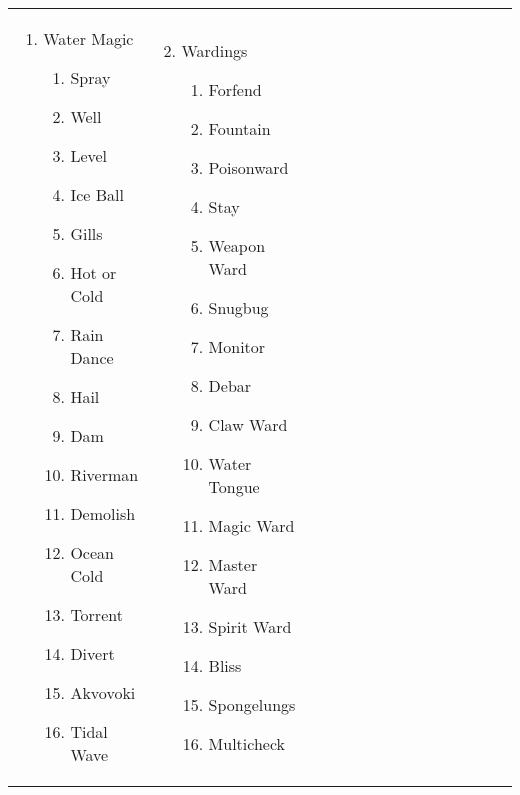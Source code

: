 \renewcommand{\labelenumii}{\arabic{enumii}.}
\begin{tabular}{@{} p{0.25\linewidth} p{0.25\linewidth} p{0.25\linewidth} p{0.25\linewidth}}
\begin{enumerate}
	\item Water Magic
	\begin{enumerate}
		\item Spray
		\item Well
		\item Level
		\item Ice Ball
		\item Gills
		\item Hot or Cold
		\item Rain Dance
		\item Hail
		\item Dam
		\item Riverman
		\item Demolish
		\item Ocean Cold
		\item Torrent
		\item Divert
		\item Akvovoki
		\item Tidal Wave
	\end{enumerate}
\end{enumerate} &
\begin{enumerate}
	\setcounter{enumi}{1}
	\item Wardings
	\begin{enumerate}
		\item Forfend
		\item Fountain
		\item Poisonward
		\item Stay
		\item Weapon Ward
		\item Snugbug
		\item Monitor
		\item Debar
		\item Claw Ward
		\item Water Tongue
		\item Magic Ward
		\item Master Ward
		\item Spirit Ward
		\item Bliss
		\item Spongelungs
		\item Multicheck
	\end{enumerate}
\end{enumerate} &
\begin{enumerate}

\end{enumerate}
\end{tabular}
